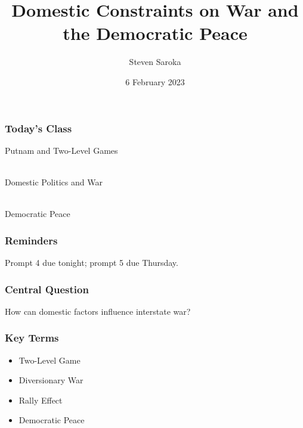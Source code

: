 \documentclass[handout]{beamer}
\title[Domestic Constraints and the Democratic Peace]{\LARGE{Domestic Constraints on War and the Democratic Peace}}
\author[POLI 150]{Steven Saroka}
\institute{POLI 150}
\date{6 February 2023}
\begin{document}
\begin{frame}
\titlepage %
\end{frame}



\begin{frame} 
	\frametitle{\LARGE{Today's Class}}
	\begin{itemize}
		\Large{
			\item Putnam and Two-Level Games
			\\~\\ 
			\item Domestic Politics and War
			\\~\\ 
			\item Democratic Peace
		}
	\end{itemize}
\end{frame}

\begin{frame} 
	\frametitle{\LARGE{Reminders}}
	\begin{itemize}
		\Large{
			\item Prompt 4 due tonight; prompt 5 due Thursday.
		}
	\end{itemize}
\end{frame}

\begin{frame} 
	\frametitle{\LARGE{Central Question}}
	\centering
	\Large{How can domestic factors influence interstate war?}
\end{frame}

\begin{frame} 
	\frametitle{\LARGE{Key Terms}}
	\begin{itemize}
		\item Two-Level Game 
		\item Diversionary War
		\item Rally Effect
		\item Democratic Peace
	\end{itemize}
\end{frame}

\end{document}
